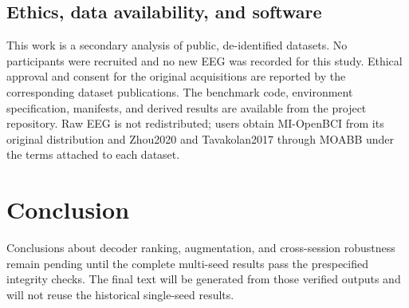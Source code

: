 \documentclass[conference]{IEEEtran}
\begin{document}
\subsection{Ethics, data availability, and software}

This work is a secondary analysis of public, de-identified datasets. No participants were
recruited and no new EEG was recorded for this study. Ethical approval and consent for the
original acquisitions are reported by the corresponding dataset publications. The benchmark code,
environment specification, manifests, and derived results are available from the project
repository. Raw EEG is not redistributed; users obtain MI-OpenBCI from its original distribution
and Zhou2020 and Tavakolan2017 through MOABB under the terms attached to each dataset.

\section{Conclusion}

Conclusions about decoder ranking, augmentation, and cross-session robustness remain pending until
the complete multi-seed results pass the prespecified integrity checks. The final text will be
generated from those verified outputs and will not reuse the historical single-seed results.
\end{document}
